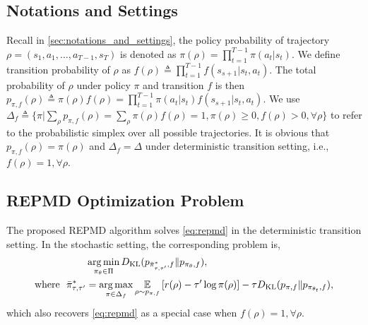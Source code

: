 \subsection{Notations and Settings}

Recall in \cref{sec:notations_and_settings}, the policy probability of trajectory $\rho=(s_1, a_1, \dots, a_{T-1}, s_T)$ is denoted as $\pi(\rho) = \prod_{t=1}^{T-1} \pi(a_t| s_t)$. We define transition probability of $\rho$ as $f(\rho) \triangleq \prod_{t=1}^{T-1}{ f(s_{s+1} | s_t, a_t)}$. The total probability of $\rho$ under policy $\pi$ and transition $f$ is then $p_{\pi, f}(\rho) \triangleq \pi(\rho) f(\rho) = \prod_{t=1}^{T-1}{ \pi(a_t | s_t) f(s_{s+1} | s_t, a_t)}$. We use $\Delta_{f} \triangleq \{ \pi | \sum_{\rho}{ p_{\pi, f}(\rho) } = \sum_{\rho}{\pi(\rho) f(\rho)} = 1, \pi(\rho) \ge 0, f(\rho) > 0, \forall \rho \}$ to refer to the probabilistic simplex over all possible trajectories. It is obvious that $p_{\pi, f}(\rho) = \pi(\rho)$ and $\Delta_f = \Delta$ under deterministic transition setting, i.e., $f(\rho) = 1, \forall \rho$.

\subsection{REPMD Optimization Problem}

The proposed REPMD algorithm solves \cref{eq:repmd} in the deterministic transition setting. In the stochastic setting, the corresponding problem is,
\begin{equation}
\label{eq:repmd_stochastic}
\begin{split}
	&\operatorname*{arg\,min}\limits_{\pi_\theta \in \Pi}{D_{\mathrm{KL}}(p_{\bar{\pi}_{\tau,\tau^{\prime}}^*, f}  \| p_{\pi_\theta, f} ) }, \\
	\text{where}\ \ \bar{\pi}_{\tau,\tau^{\prime}}^* & =  \operatorname*{arg\,max}\limits_{\pi \in \Delta_f}{ \operatorname*{\mathbb{E}}\limits_{\rho \sim p_{\pi, f}}{ \left[ r(\rho) - \tau^{\prime} \log{\pi(\rho)} \right] } - \tau D_{\mathrm{KL}}(p_{\pi, f} \| p_{\pi_{\theta_t}, f} ) },
\end{split}
\end{equation}
which also recovers \cref{eq:repmd} as a special case when $f(\rho) = 1, \forall \rho$.

